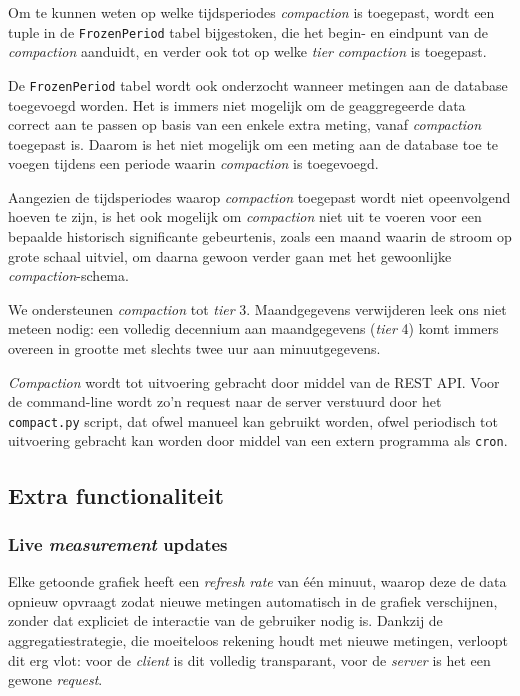 \documentclass[12pt,parskip=full]{article}
\begin{document}
Om te kunnen weten op welke tijdsperiodes \emph{compaction} is toegepast, wordt een tuple in de \texttt{FrozenPeriod} tabel bijgestoken, die het begin- en eindpunt van de \emph{compaction} aanduidt, en verder ook tot op welke \emph{tier} \emph{compaction} is toegepast. 

De \texttt{FrozenPeriod} tabel wordt ook onderzocht wanneer metingen aan de database toegevoegd worden. Het is immers niet mogelijk om de geaggregeerde data correct aan te passen op basis van een enkele extra meting, vanaf \emph{compaction} toegepast is. Daarom is het niet mogelijk om een meting aan de database toe te voegen tijdens een periode waarin \emph{compaction} is toegevoegd.

Aangezien de tijdsperiodes waarop \emph{compaction} toegepast wordt niet opeenvolgend hoeven te zijn, is het ook mogelijk om \emph{compaction} niet uit te voeren voor een bepaalde historisch significante gebeurtenis, zoals een maand waarin de stroom op grote schaal uitviel, om daarna gewoon verder gaan met het gewoonlijke \emph{compaction}-schema.

We ondersteunen \emph{compaction} tot \emph{tier} 3. Maandgegevens verwijderen leek ons niet meteen nodig: een volledig decennium aan maandgegevens (\emph{tier} 4) komt immers overeen in grootte met slechts twee uur aan minuutgegevens.

\emph{Compaction} wordt tot uitvoering gebracht door middel van de REST API. Voor de command-line wordt zo'n request naar de server verstuurd door het \texttt{compact.py} script, dat ofwel manueel kan gebruikt worden, ofwel periodisch tot uitvoering gebracht kan worden door middel van een extern programma als \texttt{cron}.

\subsection{Extra functionaliteit}

\subsubsection{Live \emph{measurement} updates}

Elke getoonde grafiek heeft een \emph{refresh rate} van één minuut, waarop deze de data opnieuw opvraagt zodat nieuwe metingen automatisch in de grafiek verschijnen, zonder dat expliciet de interactie van de gebruiker nodig is.
Dankzij de aggregatiestrategie, die moeiteloos rekening houdt met nieuwe metingen, verloopt dit erg vlot: voor de \emph{client} is dit volledig transparant, voor de \emph{server} is het een gewone \emph{request}.
\end{document}
